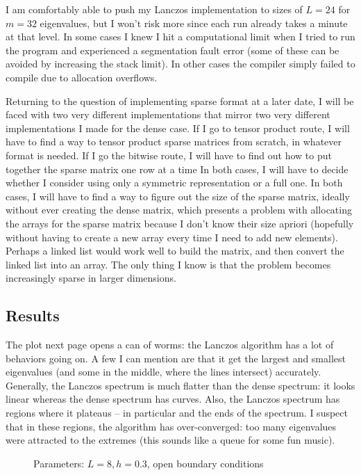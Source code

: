 \documentclass{article}
\begin{document}
I am comfortably able to push my Lanczos implementation to sizes of $L = 24$
for $m = 32$ eigenvalues, but I won't risk more since each run already takes
a minute at that level.
In some cases I knew I hit a computational limit when I tried to run the program
and experienced a segmentation fault error 
(some of these can be avoided by increasing the stack limit).
In other cases the compiler simply failed to compile due to allocation overflows.

Returning to the question of implementing sparse format at a later date,
I will be faced with two very different implementations that mirror
two very different implementations I made for the dense case.
If I go to tensor product route, I will have to find a way to tensor
product sparse matrices from scratch, in whatever format is needed.
If I go the bitwise route, I will have to find out how to put together
the sparse matrix one row at a time
In both cases, I will have to decide whether I consider using only a
symmetric representation or a full one.
In both cases, I will have to find a way to figure out the size of the
sparse matrix, ideally without ever creating the dense matrix, which
presents a problem with allocating the arrays for the sparse matrix
because I don't know their size apriori (hopefully without having to create 
a new array every time I need to add new elements).
Perhaps a linked list would work well to build the matrix, and then 
convert the linked list into an array.
The only thing I know is that the problem becomes
increasingly sparse in larger dimensions. 

\subsection{
Results
}

The plot next page opens a can of worms: the Lanczos algorithm has
a lot of behaviors going on.
A few I can mention are that it get the largest and smallest
eigenvalues (and some in the middle, where the lines intersect)
accurately.
Generally, the Lanczos spectrum is much flatter than the dense spectrum:
it looks linear whereas the dense spectrum has curves.
Also, the Lanczos spectrum has regions where it plateaus -- in particular
and the ends of the spectrum.
I suspect that in these regions, the algorithm has over-converged: too
many eigenvalues were attracted to the extremes
(this sounds like a queue for some fun music).

\begin{figure}[h]


\caption{
    Parameters: $L = 8, h = 0.3$, open boundary conditions
}
\end{figure}
\end{document}
